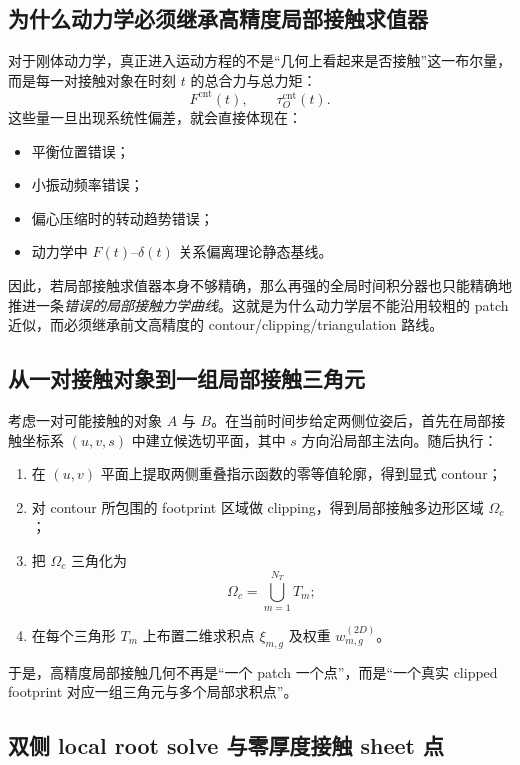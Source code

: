 \documentclass[12pt,a4paper]{ctexart}
\begin{document}
\subsection{为什么动力学必须继承高精度局部接触求值器}

对于刚体动力学，真正进入运动方程的不是“几何上看起来是否接触”这一布尔量，而是每一对接触对象在时刻 $t$ 的总合力与总力矩：
\begin{equation}
    F^{\mathrm{cnt}}(t),
    \qquad
    \tau^{\mathrm{cnt}}_O(t).
\end{equation}
这些量一旦出现系统性偏差，就会直接体现在：
\begin{itemize}
    \item 平衡位置错误；
    \item 小振动频率错误；
    \item 偏心压缩时的转动趋势错误；
    \item 动力学中 $F(t)$--$\delta(t)$ 关系偏离理论静态基线。
\end{itemize}
因此，若局部接触求值器本身不够精确，那么再强的全局时间积分器也只能精确地推进一条\emph{错误的局部接触力学曲线}。这就是为什么动力学层不能沿用较粗的 patch 近似，而必须继承前文高精度的 contour/clipping/triangulation 路线。

\subsection{从一对接触对象到一组局部接触三角元}

考虑一对可能接触的对象 $A$ 与 $B$。在当前时间步给定两侧位姿后，首先在局部接触坐标系 $(u,v,s)$ 中建立候选切平面，其中 $s$ 方向沿局部主法向。随后执行：
\begin{enumerate}
    \item 在 $(u,v)$ 平面上提取两侧重叠指示函数的零等值轮廓，得到显式 contour；
    \item 对 contour 所包围的 footprint 区域做 clipping，得到局部接触多边形区域 $\Omega_c$；
    \item 把 $\Omega_c$ 三角化为
    \begin{equation}
        \Omega_c = \bigcup_{m=1}^{N_T} T_m;
    \end{equation}
    \item 在每个三角形 $T_m$ 上布置二维求积点 $\xi_{m,g}$ 及权重 $w_{m,g}^{(2D)}$。
\end{enumerate}
于是，高精度局部接触几何不再是“一个 patch 一个点”，而是“一个真实 clipped footprint 对应一组三角元与多个局部求积点”。

\subsection{双侧 local root solve 与零厚度接触 sheet 点}
\end{document}
